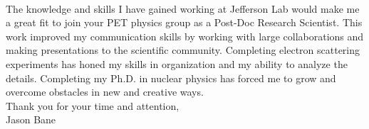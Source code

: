 \documentclass[12pt,letterpaper]{article}
\begin{document}
\paragraph{}The knowledge and skills I have gained working at Jefferson Lab would make me a great fit to join your PET physics group as a Post-Doc Research Scientist. This work improved my communication skills by working with large collaborations and making presentations to the scientific community. Completing electron scattering experiments has honed my skills in organization and my ability to analyze the details. Completing my Ph.D. in nuclear physics has forced me to grow and overcome obstacles in new and creative ways.
\\

\noindent Thank you for your time and attention,\\
\noindent Jason Bane
\end{document}
